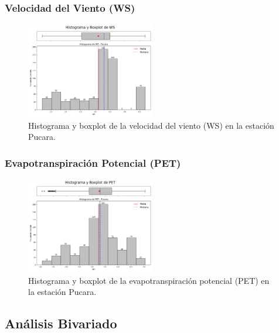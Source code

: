 \subsubsection*{Velocidad del Viento (WS)}
\begin{figure}[H]
\centering
\includegraphics[width=0.5\textwidth]{resultados/por_estacion_meteorologica/Pucara/WS_histograma.png}
\caption{Histograma y boxplot de la velocidad del viento (WS) en la estación Pucara.}
\label{fig:pucara_WS}
\end{figure}

\subsubsection*{Evapotranspiración Potencial (PET)}
\begin{figure}[H]
\centering
\includegraphics[width=0.5\textwidth]{resultados/por_estacion_meteorologica/Pucara/PET_histograma.png}
\caption{Histograma y boxplot de la evapotranspiración potencial (PET) en la estación Pucara.}
\label{fig:pucara_PET}
\end{figure}

\subsection{Análisis Bivariado}

